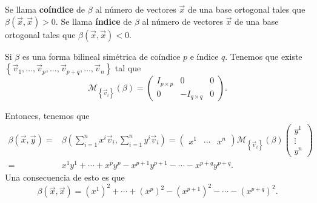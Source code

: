 \begin{fdefinition}
\normalfont Se llama \textbf{coíndice} de $\displaystyle \beta  $ al número de vectores $\displaystyle \vec{x} $ de una base ortogonal tales que $\displaystyle \beta\left(\vec{x}, \vec{x}\right) > 0 $. Se llama \textbf{índice} de $\displaystyle \beta  $ al número de vectores $\displaystyle \vec{x} $ de una base ortogonal tales que $\displaystyle \beta\left(\vec{x}, \vec{x}\right) < 0 $.
\end{fdefinition}
\begin{observation}
	\normalfont Si $\displaystyle \beta  $ es una forma bilineal simétrica de coíndice $\displaystyle p $ e índice $\displaystyle q $. Tenemos que existe $\displaystyle \left\{ \vec{v}_{1}, \ldots, \vec{v}_{p}, \ldots, \vec{v}_{p +q}, \ldots, \vec{v}_{n}\right\}  $ tal que 
	\[\mathcal{M}_{ \left\{ \vec{v}_{i}\right\} }\left(\beta \right) = \begin{pmatrix} I_{p \times p} & 0 & 0 \\ 0 & - I_{q \times q} & 0\end{pmatrix} .\]
\end{observation}
Entonces, tenemos que 
\[
\begin{split}
	\beta\left(\vec{x}, \vec{y}\right)= & \beta\left(\sum^{n}_{i = 1}x^{i}\vec{v}_{i}, \sum^{n}_{i = 1}y^{i}\vec{v}_{i}\right) = \begin{pmatrix} x^{1} & \cdots & x^{n} \end{pmatrix} \mathcal{M}_{ \left\{ \vec{v}_{i}\right\} }\left(\beta \right) \begin{pmatrix} y^{1} \\ \vdots \\ y^{n} \end{pmatrix} \\
	= & x^{1}y^{1} + \cdots + x^{p}y^{p} - x^{p +1}y^{p +1} - \cdots - x^{p + q}y ^{p + q}.
\end{split}
\]
Una consecuencia de esto es que 
\[\beta\left(\vec{x}, \vec{x}\right) = \left(x^{1}\right)^{2} + \cdots + \left(x^{p}\right)^{2} - \left(x^{p + 1}\right)^{2} - \cdots - \left(x^{p + q}\right)^{2} .\]
